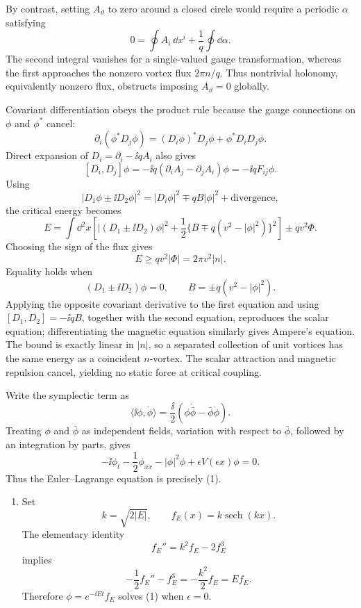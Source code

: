 \begin{enumerate}
  By contrast, setting \(A_\vartheta\) to zero around a closed circle would
  require a periodic \(\alpha\) satisfying
  \[
    0=\oint A_i\,\dd x^i
      +\frac1q\oint \dd\alpha .
  \]
  The second integral vanishes for a single-valued gauge transformation,
  whereas the first approaches the nonzero vortex flux
  \(2\pi n/q\).  Thus nontrivial holonomy, equivalently nonzero flux,
  obstructs imposing \(A_\vartheta=0\) globally.

  Covariant differentiation obeys the product rule because the gauge
  connections on \(\phi\) and \(\phi^*\) cancel:
  \[
    \partial_i(\phi^*D_j\phi)
      =(D_i\phi)^*D_j\phi+\phi^*D_iD_j\phi.
  \]
  Direct expansion of \(D_i=\partial_i-\ii qA_i\) also gives
  \[
    [D_i,D_j]\phi=-\ii q(\partial_iA_j-\partial_jA_i)\phi
      =-\ii qF_{ij}\phi .
  \]
  Using
  \[
    |D_1\phi\pm \ii D_2\phi|^2
      =|D_i\phi|^2\mp qB|\phi|^2+\text{divergence},
  \]
  the critical energy becomes
  \[
    E=\int \dd^2x\left[
      |(D_1\pm \ii D_2)\phi|^2
      +\frac12\{B\mp q(v^2-|\phi|^2)\}^2\right]
      \pm qv^2\Phi .
  \]
  Choosing the sign of the flux gives
  \[
    E\geq qv^2|\Phi|=2\pi v^2|n|.
  \]
  Equality holds when
  \[
    (D_1\pm \ii D_2)\phi=0,\qquad
    B=\pm q(v^2-|\phi|^2).
  \]
  Applying the opposite covariant derivative to the first equation and
  using \([D_1,D_2]=-\ii qB\), together with the second equation, reproduces
  the scalar equation; differentiating the magnetic equation similarly
  gives Ampere's equation.  The bound is exactly linear in \(|n|\), so a
  separated collection of unit vortices has the same energy as a coincident
  \(n\)-vortex.  The scalar attraction and magnetic repulsion cancel,
  yielding no static force at critical coupling.

  Write the symplectic term as
  \[
    \langle \ii\phi,\dot\phi\rangle
      =\frac{\ii}{2}(\phi\dot{\bar\phi}-\bar\phi\dot\phi).
  \]
  Treating \(\phi\) and \(\bar\phi\) as independent fields, variation
  with respect to \(\bar\phi\), followed by an integration by parts,
  gives
  \[
    -\ii\phi_t-\frac12\phi_{xx}-|\phi|^2\phi
      +\epsilon V(\epsilon x)\phi=0.
  \]
  Thus the Euler--Lagrange equation is precisely (1).

  \begin{enumerate}
    \item[(i)]
    Set
    \[
      k=\sqrt{2|E|},\qquad f_E(x)=k\operatorname{sech}(kx).
    \]
    The elementary identity
    \[
      f_E''=k^2f_E-2f_E^3
    \]
    implies
    \[
      -\frac12f_E''-f_E^3=-\frac{k^2}{2}f_E=Ef_E.
    \]
    Therefore \(\phi=e^{-\ii Et}f_E\) solves (1) when \(\epsilon=0\).


\end{enumerate}
\end{enumerate}
